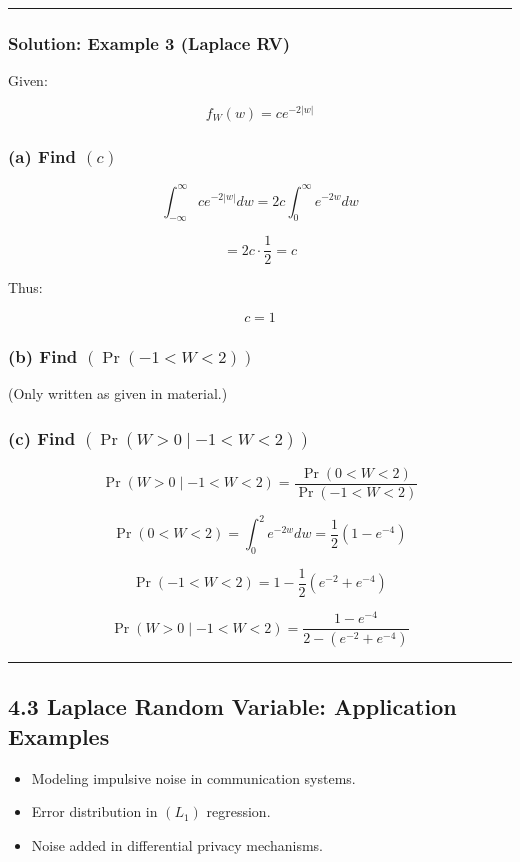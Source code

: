 \documentclass[12pt]{article}
\begin{document}
\hrule
\vspace{1em}

\subsubsection*{\textbf{Solution: Example 3 (Laplace RV)}}

Given:

\[
f_W(w)=ce^{-2|w|}
\]

\subsubsection*{\textbf{(a) Find $(c)$}}

\[
\int_{-\infty}^{\infty}ce^{-2|w|}dw
=2c\int_0^\infty e^{-2w}dw
\]

\[
=2c\cdot\frac{1}{2}=c
\]

Thus:

\[
c=1
\]

\subsubsection*{\textbf{(b) Find $(\Pr(-1<W<2))$}}

(Only written as given in material.)

\subsubsection*{\textbf{(c) Find $(\Pr(W>0 \mid -1<W<2))$}}

\[
\Pr(W>0\mid -1<W<2)=\frac{\Pr(0<W<2)}{\Pr(-1<W<2)}
\]

\[
\Pr(0<W<2)=\int_0^2 e^{-2w}dw=\frac{1}{2}(1-e^{-4})
\]

\[
\Pr(-1<W<2)=1-\frac{1}{2}(e^{-2}+e^{-4})
\]

\[
\Pr(W>0\mid -1<W<2)=\frac{1-e^{-4}}{2-(e^{-2}+e^{-4})}
\]

\hrule
\vspace{1em}

\subsection*{\textbf{4.3 Laplace Random Variable: Application Examples}}

\begin{itemize}
    \item Modeling impulsive noise in communication systems.
    \item Error distribution in $(L_1)$ regression.
    \item Noise added in differential privacy mechanisms.
\end{itemize}
\end{document}
